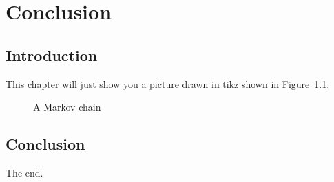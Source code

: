 
\chapter{Conclusion}\label{cha:conclusion}

\section{Introduction}

This chapter will just show you a picture drawn in tikz shown in
Figure~\ref{fig:markov_chain}.

\begin{figure}[!hbtp]
    \begin{center}
        
        \caption{A Markov chain}\label{fig:markov_chain}
    \end{center}
\end{figure}

\section{Conclusion}

The end.

\lipsum
